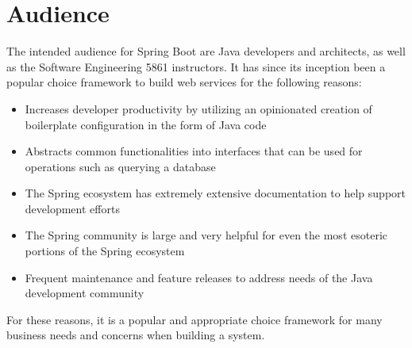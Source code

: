 \section{Audience}

The intended audience for Spring Boot are Java developers and architects, as well as the Software Engineering 5861 instructors. It has since its inception been a popular choice framework to build web services for the following reasons:

\begin{itemize}
\item Increases developer productivity by utilizing an opinionated creation of boilerplate configuration in the form of Java code
\item Abstracts common functionalities into interfaces that can be used for operations such as querying a database
\item The Spring ecosystem has extremely extensive documentation to help support development efforts
\item The Spring community is large and very helpful for even the most esoteric portions of the Spring ecosystem
\item Frequent maintenance and feature releases to address needs of the Java development community
\end{itemize}

For these reasons, it is a popular and appropriate choice framework for many business needs and concerns when building a system.